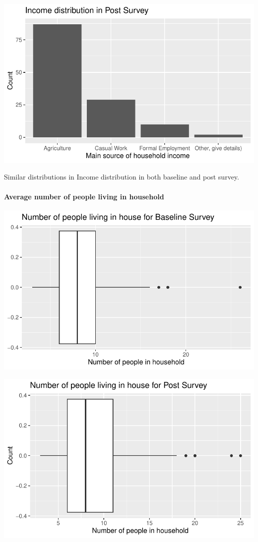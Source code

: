 \documentclass[
  letterpaper,
  DIV=11,
  numbers=noendperiod]{scrartcl}
\let\oldparagraph\paragraph
\renewcommand{\paragraph}[1]{\oldparagraph{#1}\mbox{}}
\begin{document}
\includegraphics{report_files/figure-pdf/unnamed-chunk-22-1.pdf}

Similar distributions in Income distribution in both baseline and post
survey.

\hypertarget{average-number-of-people-living-in-household}{%
\paragraph{Average number of people living in
household}\label{average-number-of-people-living-in-household}}

\includegraphics{report_files/figure-pdf/unnamed-chunk-23-1.pdf}

\includegraphics{report_files/figure-pdf/unnamed-chunk-24-1.pdf}
\end{document}
